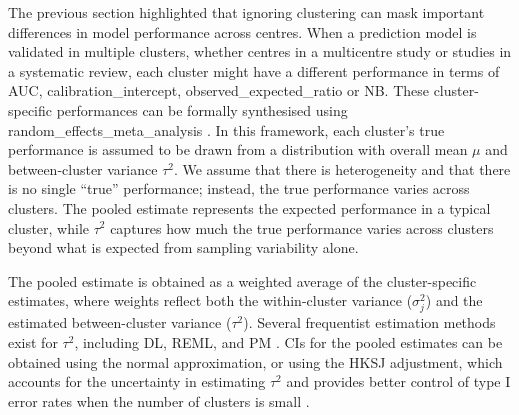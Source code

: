 The previous section highlighted that ignoring clustering can mask important differences in model performance across centres. When a prediction model is validated in multiple clusters, whether centres in a multicentre study or studies in a systematic review, each cluster might have a different performance in terms of \gls{AUC}, \gls{calibration_intercept}, \gls{observed_expected_ratio} or \gls{NB}. These cluster-specific performances can be formally synthesised using \gls{random_effects_meta_analysis} \cite{debrayGuideSystematicReview2017,debrayFrameworkMetaanalysisPrediction2019}. In this framework, each cluster's true performance is assumed to be drawn from a distribution with overall mean $\mu$ and between-cluster variance $\tau^2$. We assume that there is \gls{heterogeneity} and that there is no single \enquote{true} performance; instead, the true performance varies across clusters. The pooled estimate represents the expected performance in a typical cluster, while $\tau^2$ captures how much the true performance varies across clusters beyond what is expected from sampling variability alone.

The pooled estimate is obtained as a weighted average of the cluster-specific estimates, where weights reflect both the within-cluster variance ($\sigma_j^2$) and the estimated between-cluster variance ($\tau^2$). Several frequentist estimation methods exist for $\tau^2$, including \gls{DL}, \gls{REML}, and \gls{PM} \cite{veronikiMethodsEstimateBetweenstudy2016}. \Glspl{CI} for the pooled estimates can be obtained using the normal approximation, or using the \gls{HKSJ} adjustment, which accounts for the uncertainty in estimating $\tau^2$ and provides better control of type I error rates when the number of clusters is small \cite{inthoutHartungKnappSidikJonkmanMethodRandom2014}.

